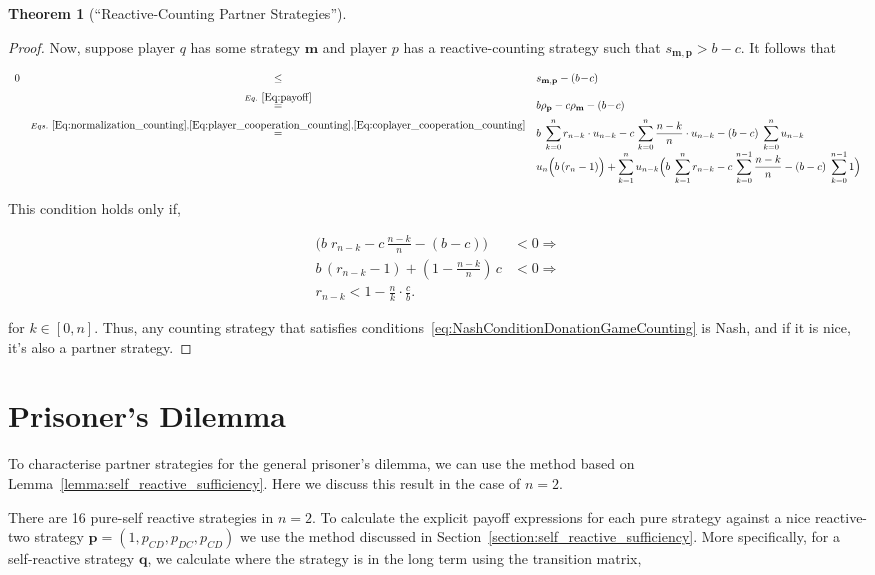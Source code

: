 \documentclass{article}
\theoremstyle{definition}
\newtheorem{theorem}{Theorem}[section]
\begin{document}
\begin{theorem}[``Reactive-Counting Partner Strategies'']
\begin{proof}
Now, suppose player $q$ has some strategy $\mathbf{m}$ and player $p$ has a reactive-counting
strategy such that $s_{\mathbf{m}, \mathbf{p}} > b\!-\!c$. It follows that

\begin{equation}
\begin{array}{rcl}
0 	&\le	&s_{\mathbf{m}, \mathbf{p}}-(b\!-\!c)\\[0.2cm]
  &\stackrel{Eq.~\eqref{Eq:payoff}}{=}	&b\rho_\mathbf{p} - c\rho_\mathbf{m}-(b\!-\!c)\\[0.2cm]
  &\stackrel{Eqs.~\eqref{Eq:normalization_counting}, \eqref{Eq:player_cooperation_counting}, \eqref{Eq:coplayer_cooperation_counting}}{=}	& 
  \displaystyle b\; \sum_{k=0}^{n} r_{n - k} \cdot u_{n - k} - c\, \sum_{k=0}^{n} \frac{n - k}{n} \cdot u_{n - k} - (b - c)\; \sum_{k=0}^{n} u_{n - k}\\[0.2cm]
  & & \displaystyle  u_{n} \Big(b\, (r_n - 1) \Big) +  \sum_{k=1}^{n} u_{n - k} \Big(b\; \sum_{k=1}^{n} r_{n - k} - c\, \sum_{k=0}^{n - 1} \frac{n - k}{n} - (b - c)\; \sum_{k=0}^{n - 1} 1\Big)
\end{array}
\end{equation}

This condition holds only if,

\begin{align}
  \Big(b\; r_{n - k} - c\, \frac{n - k}{n} - (b - c)\Big) & < 0 \Rightarrow \\ 
  b \, (r_{n - k} - 1) + (1 - \frac{n - k}{n})\, c & < 0 \Rightarrow \\ 
  r_{n - k} < 1 - \frac{n}{k} \cdot \frac{c}{b}.
\end{align}

for $k \in [0, n]$. Thus, any counting strategy that satisfies conditions~\eqref{eq:NashConditionDonationGameCounting}
is Nash, and if it is nice, it's also a partner strategy.
\end{proof}

\end{theorem}

\section{Prisoner's Dilemma}

To characterise partner strategies for the general prisoner's dilemma, we can
use the method based on Lemma~\ref{lemma:self_reactive_sufficiency}. Here
we discuss this result in the case of $n=2$.

There are 16 pure-self reactive strategies in $n=2$. To calculate the explicit
payoff expressions for each pure strategy against a nice reactive-two strategy
$\mathbf{p} = (1, p_{CD}, p_{DC}, p_{CD})$ we use the method discussed in
Section~\ref{section:self_reactive_sufficiency}. More specifically, for a
self-reactive strategy $\mathbf{q}$, we calculate where the strategy is in
the long term using the transition matrix,
\end{document}

